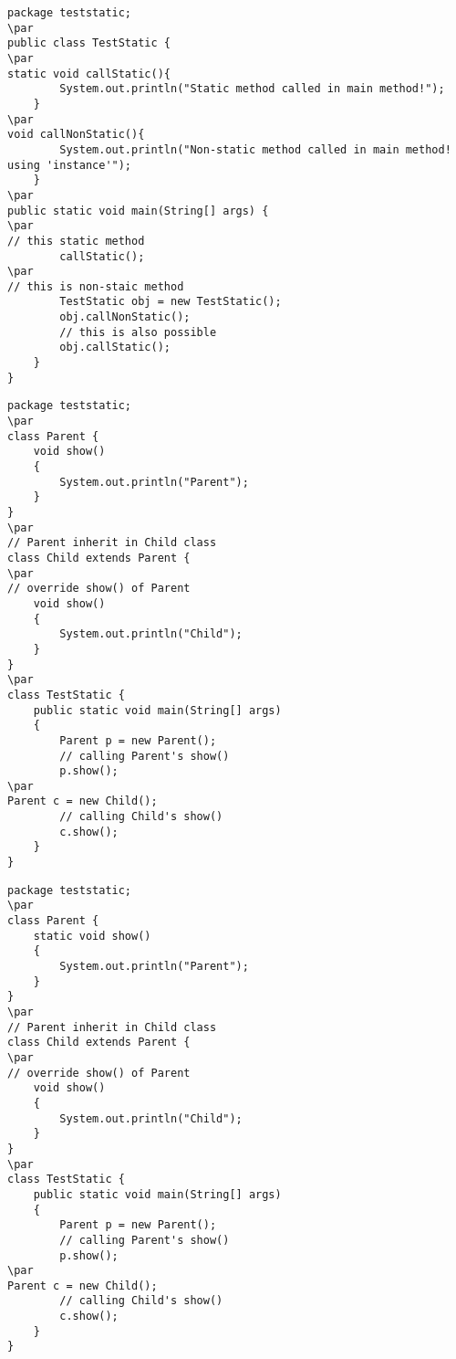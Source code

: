 \documentclass{book}
\def\lthtmlcheckvsize{\ifdim\ht\sizebox<\vsize 
  \ifdim\wd\sizebox<\hsize\expandafter\hfill\fi \expandafter\vfill
  \else\expandafter\vss\fi}%
\begin{document}
{\newpage\clearpage
{}%
\begin{lstlisting}
package teststatic;
\par
public class TestStatic {
\par
static void callStatic(){
		System.out.println("Static method called in main method!");
	}
\par
void callNonStatic(){
		System.out.println("Non-static method called in main method! using 'instance'");
	}
\par
public static void main(String[] args) {
\par
// this static method
		callStatic();
\par
// this is non-staic method
		TestStatic obj = new TestStatic();
		obj.callNonStatic();
		// this is also possible
		obj.callStatic();
	}
}
\end{lstlisting}%
\lthtmlfigureZ
\lthtmlcheckvsize\clearpage}

{\newpage\clearpage
{}%
\begin{lstlisting}
package teststatic;
\par
class Parent { 
    void show() 
    { 
        System.out.println("Parent"); 
    } 
} 
\par
// Parent inherit in Child class 
class Child extends Parent { 
\par
// override show() of Parent 
    void show() 
    { 
        System.out.println("Child"); 
    } 
} 
\par
class TestStatic { 
    public static void main(String[] args) 
    { 
        Parent p = new Parent(); 
        // calling Parent's show() 
        p.show(); 
\par
Parent c = new Child(); 
        // calling Child's show() 
        c.show(); 
    } 
} 
\end{lstlisting}%
\lthtmlfigureZ
\lthtmlcheckvsize\clearpage}

{\newpage\clearpage
{}%
\begin{lstlisting}
package teststatic;
\par
class Parent { 
    static void show() 
    { 
        System.out.println("Parent"); 
    } 
} 
\par
// Parent inherit in Child class 
class Child extends Parent { 
\par
// override show() of Parent 
    void show() 
    { 
        System.out.println("Child"); 
    } 
} 
\par
class TestStatic { 
    public static void main(String[] args) 
    { 
        Parent p = new Parent(); 
        // calling Parent's show() 
        p.show(); 
\par
Parent c = new Child(); 
        // calling Child's show() 
        c.show(); 
    } 
} 
\end{lstlisting}%
\lthtmlfigureZ
\lthtmlcheckvsize\clearpage}
\end{document}
